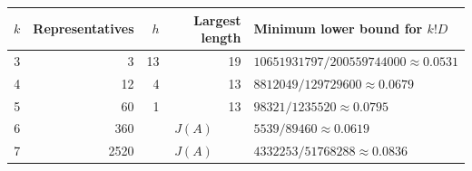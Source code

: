 \begin{tabular}{@{}rrrrl@{}}
\toprule
$k$&Representatives&$h$&Largest length&Minimum lower bound for $k!D$\\
\midrule
3&3&13&19&$10651931797/200559744000\approx0.0531$\\
4&12&4&13&$8812049/129729600\approx0.0679$\\
5&60&1&13&$98321/1235520\approx0.0795$\\
6&360&\multicolumn{2}{c}{$J(A)$}&$5539/89460\approx0.0619$\\
7&2520&\multicolumn{2}{c}{$J(A)$}&$4332253/51768288\approx0.0836$\\
\bottomrule
\end{tabular}
